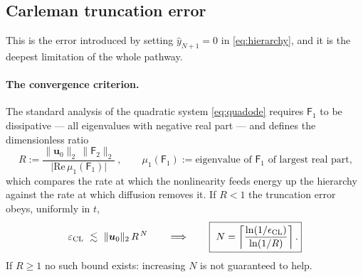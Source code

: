 \documentclass[11pt,a4paper]{article}
\theoremstyle{plain}
\theoremstyle{definition}
\theoremstyle{remark}
\newcommand{\norm}[1]{\lVert #1 \rVert}
\newcommand{\abs}[1]{\lvert #1 \rvert}
\newcommand{\uvec}{\bm{u}}
\newcommand{\Fone}{\mathsf{F}_1}
\newcommand{\Ftwo}{\mathsf{F}_2}
\begin{document}
\subsection{Carleman truncation error}
\label{sec:carleman-err}

This is the error introduced by setting $\hat y_{N+1}=0$ in
\eqref{eq:hierarchy}, and it is the deepest limitation of the whole pathway.

\paragraph{The convergence criterion.}  The standard analysis
\cite{Liu2021,Forets2017} of the quadratic system \eqref{eq:quadode} requires
$\Fone$ to be dissipative --- all eigenvalues with negative real part --- and
defines the dimensionless ratio
\begin{equation}
\boxed{\ R:=\frac{\norm{\uvec_0}_2\,\norm{\Ftwo}_2}
{\abs{\mathrm{Re}\,\mu_1(\Fone)}}\ },
\qquad
\mu_1(\Fone):=\text{eigenvalue of }\Fone\text{ of largest real part},
\label{eq:Rdef}
\end{equation}
which compares the rate at which the nonlinearity feeds energy up the hierarchy
against the rate at which diffusion removes it.  If $R<1$ the truncation error
obeys, uniformly in $t$,
\begin{equation}
\varepsilon_{\rm CL}\ \lesssim\ \norm{\uvec_0}_2\,R^{\,N}
\qquad\Longrightarrow\qquad
\boxed{\ N=\left\lceil\frac{\ln(1/\epsilon_{\rm CL})}{\ln(1/R)}\right\rceil.}
\label{eq:Nreq}
\end{equation}
If $R\ge1$ no such bound exists: increasing $N$ is not guaranteed to help.
\end{document}
